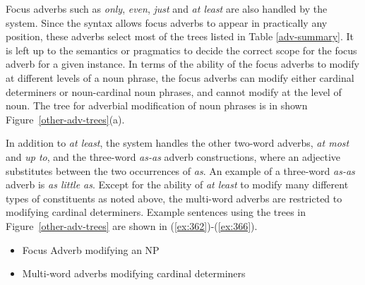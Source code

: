  
Focus adverbs such as {\it only}, {\it even}, {\it just} and {\it at least} 
are also handled by the system.  Since the syntax allows focus adverbs to 
appear in practically any position, these adverbs select most of the trees 
listed in Table \ref{adv-summary}.  It is left up to the semantics or 
pragmatics to decide the correct scope for the focus adverb for a given 
instance.  In terms of the ability of the focus adverbs to modify at different 
levels of a noun phrase, the focus adverbs can modify either cardinal 
determiners or noun-cardinal noun phrases, and cannot modify at the level of 
noun.  The tree for adverbial modification of noun phrases is in shown 
Figure~\ref{other-adv-trees}(a). 
 
In addition to {\it at least}, the system handles the other two-word 
adverbs, {\it at most} and {\it up to}, and the three-word {\it as-as} 
adverb constructions, where an adjective substitutes between the two 
occurrences of {\it as}.  An example of a three-word {\it as-as} adverb 
is {\it as little as}.  Except for the ability of {\it at least} to 
modify many different types of constituents as noted above, the 
multi-word adverbs are restricted to modifying cardinal determiners. 
Example sentences using the trees in Figure~\ref{other-adv-trees} are 
shown in (\ref{ex:362})-(\ref{ex:366}). 
 
\begin{itemize} 
\item{Focus Adverb modifying an NP} 
\beginsentences
{}\label{ex:362} 
\label{ex:363} 
\label{ex:364} 
\endsentences

 
\item{Multi-word adverbs modifying cardinal determiners} 
\beginsentences
{}\label{ex:365} 
\label{ex:366} 
\endsentences

 
\end{itemize} 
 

